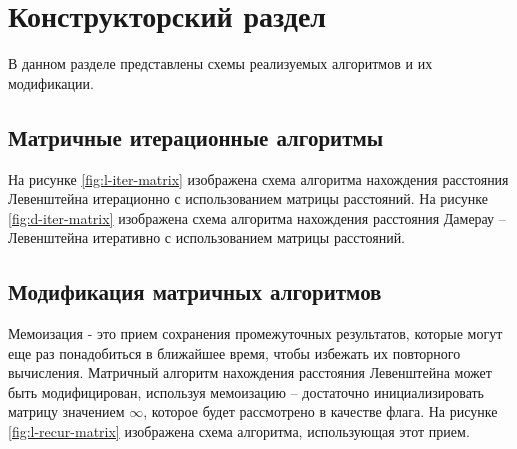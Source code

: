 \chapter{Конструкторский раздел}
В данном разделе представлены схемы реализуемых алгоритмов и их модификации.
\section{Матричные итерационные алгоритмы}
На рисунке \ref{fig:l-iter-matrix} изображена схема алгоритма нахождения расстояния Левенштейна итерационно  с использованием матрицы расстояний.
На рисунке \ref{fig:d-iter-matrix} изображена схема алгоритма нахождения расстояния Дамерау -- Левенштейна итеративно  с использованием матрицы расстояний.
\section{Модификация матричных алгоритмов}
Мемоизация - это прием сохранения промежуточных результатов, которые могут еще раз понадобиться в ближайшее время, чтобы избежать их повторного вычисления. 
Матричный алгоритм нахождения расстояния Левенштейна может быть модифицирован, используя мемоизацию -- достаточно инициализировать матрицу значением $\infty$, которое будет рассмотрено в качестве флага.
На рисунке \ref{fig:l-recur-matrix} изображена схема алгоритма, использующая этот прием.
